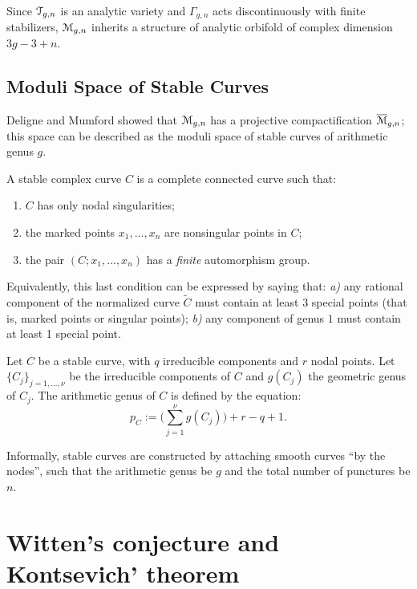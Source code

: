 Since $\mathcal{T}_{g,n}$ is an analytic variety and $\Gamma_{g,n}$ acts
discontinuously with finite stabilizers, $\mathcal{M}_{g,n}$ inherits a
structure of analytic orbifold of complex dimension $3g - 3 + n$.


\subsection{Moduli Space of Stable Curves}
\label{sec:moduli-space-stable}

Deligne and Mumford \cite{deligne-mumford} showed that $\mathcal{M}_{g,n}$ has
a projective compactification $\overline{\mathcal{M}}_{g,n}$; this space can be
described as the moduli space of stable curves of arithmetic genus
$g$.
\begin{definition}
  A stable complex curve $C$ is a complete connected curve such that:
  \begin{enumerate}
  \item $C$ has only nodal singularities;
  \item the marked points $x_1, \ldots, x_n$ are nonsingular points in
    $C$;
  \item the pair $(C; x_1, \ldots, x_n)$ has a \emph{finite} automorphism
    group.
  \end{enumerate}
\end{definition}
Equivalently, this last condition can be expressed by saying that:
\textsl{a)} any rational component of the normalized curve $\tilde C$
must contain at least 3 special points (that is, marked points or
singular points); \textsl{b)} any component of genus $1$ must contain
at least 1 special point.
\begin{definition}
  Let $C$ be a stable curve, with $q$ irreducible components and
  $r$ nodal points. Let $\{C_j\}_{j=1, \dots, \nu}$ be the
  irreducible components of $C$ and $g(C_j)$ the geometric genus
  of $C_j$.  The arithmetic genus of $C$ is defined by the equation:
  \begin{equation*}
    p_C^{} := \bigl({\textstyle \sum_{j=1}^\nu} g(C_j) \bigr) + r - q + 1.
  \end{equation*}
\end{definition}

Informally, stable curves are constructed by attaching smooth curves
``by the nodes'', such that the arithmetic genus be $g$ and the total
number of punctures be $n$.


\section{Witten's conjecture and Kontsevich' theorem}
\label{sec:witten-classes}

